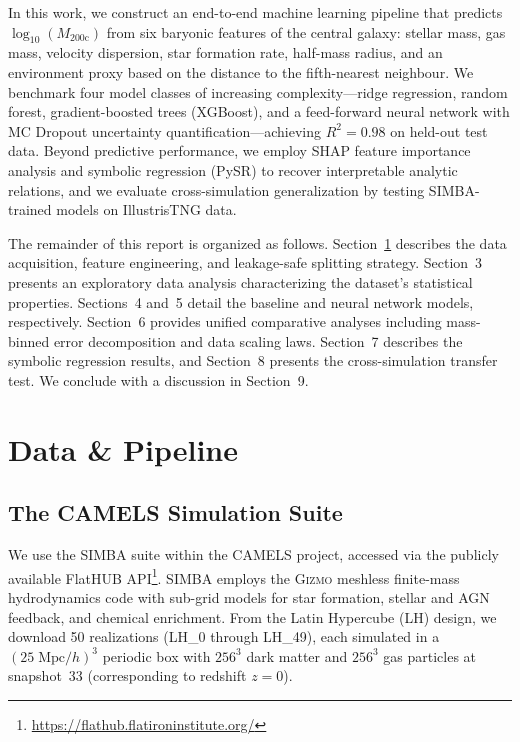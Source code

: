 \documentclass[12pt, a4paper]{article}
\newcommand{\logMhalo}{\log_{10}(M_{200\mathrm{c}})}
\begin{document}
In this work, we construct an end-to-end machine learning pipeline that predicts $\logMhalo$ from six baryonic features of the central galaxy: stellar mass, gas mass, velocity dispersion, star formation rate, half-mass radius, and an environment proxy based on the distance to the fifth-nearest neighbour.  We benchmark four model classes of increasing complexity---ridge regression, random forest, gradient-boosted trees (XGBoost), and a feed-forward neural network with MC Dropout uncertainty quantification---achieving $R^2 = 0.98$ on held-out test data.  Beyond predictive performance, we employ SHAP feature importance analysis and symbolic regression (PySR) to recover interpretable analytic relations, and we evaluate cross-simulation generalization by testing SIMBA-trained models on IllustrisTNG data.

The remainder of this report is organized as follows.  Section~\ref{sec:data} describes the data acquisition, feature engineering, and leakage-safe splitting strategy.  Section~3 presents an exploratory data analysis characterizing the dataset's statistical properties.  Sections~4 and~5 detail the baseline and neural network models, respectively.  Section~6 provides unified comparative analyses including mass-binned error decomposition and data scaling laws.  Section~7 describes the symbolic regression results, and Section~8 presents the cross-simulation transfer test.  We conclude with a discussion in Section~9.

\section{Data \& Pipeline}
\label{sec:data}

\subsection{The CAMELS Simulation Suite}
\label{sec:camels}

We use the SIMBA suite within the CAMELS project, accessed via the publicly available FlatHUB API\footnote{\url{https://flathub.flatironinstitute.org/}}.  SIMBA employs the \textsc{Gizmo} meshless finite-mass hydrodynamics code with sub-grid models for star formation, stellar and AGN feedback, and chemical enrichment.  From the Latin Hypercube (LH) design, we download 50 realizations (LH\_0 through LH\_49), each simulated in a $(25\;\mathrm{Mpc}/h)^3$ periodic box with $256^3$ dark matter and $256^3$ gas particles at snapshot~33 (corresponding to redshift $z = 0$).
\end{document}
